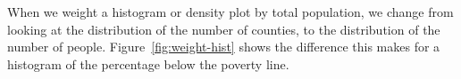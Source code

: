 When we weight a histogram or density plot by total population, we change from looking at the distribution of the number of counties, to the distribution of the number of people. Figure~\ref{fig:weight-hist} shows the difference this makes for a histogram of the percentage below the poverty line.

%



